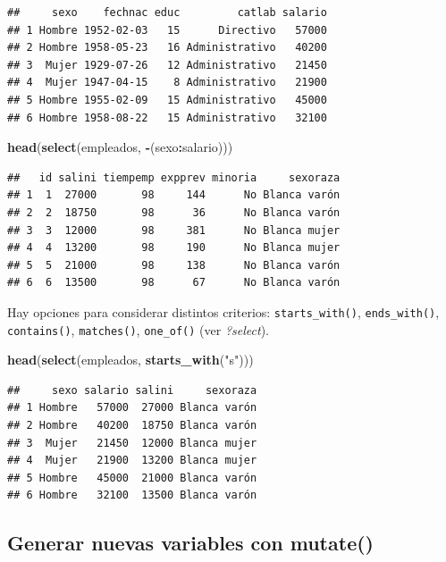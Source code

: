 \documentclass[]{book}
\newenvironment{Shaded}{\begin{snugshade}}{\end{snugshade}}
\newcommand{\KeywordTok}[1]{\textcolor[rgb]{0.13,0.29,0.53}{\textbf{#1}}}
\newcommand{\StringTok}[1]{\textcolor[rgb]{0.31,0.60,0.02}{#1}}
\newcommand{\OperatorTok}[1]{\textcolor[rgb]{0.81,0.36,0.00}{\textbf{#1}}}
\newcommand{\NormalTok}[1]{#1}
\begin{document}
\begin{verbatim}
##     sexo    fechnac educ         catlab salario
## 1 Hombre 1952-02-03   15      Directivo   57000
## 2 Hombre 1958-05-23   16 Administrativo   40200
## 3  Mujer 1929-07-26   12 Administrativo   21450
## 4  Mujer 1947-04-15    8 Administrativo   21900
## 5 Hombre 1955-02-09   15 Administrativo   45000
## 6 Hombre 1958-08-22   15 Administrativo   32100
\end{verbatim}

\begin{Shaded}
\begin{Highlighting}[]
\KeywordTok{head}\NormalTok{(}\KeywordTok{select}\NormalTok{(empleados, }\OperatorTok{-}\NormalTok{(sexo}\OperatorTok{:}\NormalTok{salario)))}
\end{Highlighting}
\end{Shaded}

\begin{verbatim}
##   id salini tiempemp expprev minoria     sexoraza
## 1  1  27000       98     144      No Blanca varón
## 2  2  18750       98      36      No Blanca varón
## 3  3  12000       98     381      No Blanca mujer
## 4  4  13200       98     190      No Blanca mujer
## 5  5  21000       98     138      No Blanca varón
## 6  6  13500       98      67      No Blanca varón
\end{verbatim}

Hay opciones para considerar distintos criterios:
\texttt{starts\_with()}, \texttt{ends\_with()}, \texttt{contains()},
\texttt{matches()}, \texttt{one\_of()} (ver \emph{?select}).

\begin{Shaded}
\begin{Highlighting}[]
\KeywordTok{head}\NormalTok{(}\KeywordTok{select}\NormalTok{(empleados, }\KeywordTok{starts_with}\NormalTok{(}\StringTok{"s"}\NormalTok{)))}
\end{Highlighting}
\end{Shaded}

\begin{verbatim}
##     sexo salario salini     sexoraza
## 1 Hombre   57000  27000 Blanca varón
## 2 Hombre   40200  18750 Blanca varón
## 3  Mujer   21450  12000 Blanca mujer
## 4  Mujer   21900  13200 Blanca mujer
## 5 Hombre   45000  21000 Blanca varón
## 6 Hombre   32100  13500 Blanca varón
\end{verbatim}

\subsection{\texorpdfstring{Generar nuevas variables con
\textbf{mutate()}}{Generar nuevas variables con mutate()}}\label{generar-nuevas-variables-con-mutate}
\end{document}

